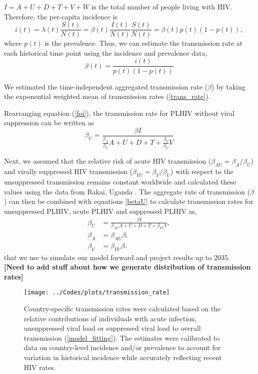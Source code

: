 \documentclass[11pt]{article}
\newcommand{\comment}[1]{\textbf{[#1]}}
\begin{document}
$I = A+U+D+T+V+W$ is the total number of people living with HIV. Therefore, the per-capita
incidence is
\begin{equation}
i(t) = \lambda(t) \frac{S(t)}{N(t)}
= \beta(t) \frac{I(t)}{N(t)} \frac{S(t)}{N(t)} =\beta(t) p(t) (1-p(t)),
\end{equation}
where $p(t)$ is the prevalence. Thus, we can estimate the
transmission rate at each historical time point using the incidence
and prevalence data,
\begin{equation}
  \label{trans_rate}
  \beta(t) = \frac{i(t)}{p(t)(1-p(t))}
\end{equation}


We estimated the time-independent aggregated transmission rate ($\beta$)
by taking the exponential weighted mean of transmission rates
(\ref{trans_rate}).


Rearranging equation (\ref{foi}), the transmission rate for PLHIV
without viral suppression can be written as
\begin{equation}
\label{betaU}
  \beta_{U} = \frac{\beta I}{\frac{\beta_{A}}{\beta_{U}}A +
    U+D+T+\frac{\beta_{V}}{\beta_{U}}V}
\end{equation}


Next, we assumed that the relative risk of acute HIV transmission
($\beta_{AU} = \beta_{A}/\beta_{U}$) and virally suppressed HIV
transmission ($\beta_{VU} = \beta_{V}/\beta_{U}$) with respect to the
unsuppressed transmission remains constant worldwide and calculated
these values using the data from Rakai, Uganda \cite{Wawer2005-us}. The aggregate
rate of transmission ($\beta$) can then be combined with equations \ref{betaU} to calculate transmission
rates for unsuppressed PLHIV, acute PLHIV and suppressed PLHIV as,
\begin{align}
  \beta_{U} & = \frac{\beta I}{\beta_{AU}A +
              U+D+T+\beta_{VU}V}, \\
  \beta_{A} & = \beta_{AU}\beta, \\
  \beta_{V} & = \beta_{VU} \beta.
\end{align}
that we use to simulate our model forward and project results up to 2035.
\\

\comment{Need to add stuff about how we generate distribution of
  transmission rates}




\begin{figure}
  \centering
  \texttt{[image: ../Codes/plots/transmission\_rate]}
  \caption{Country-specific transmission rates were calculated based
    on the relative contributions of individuals with acute infection,
    unsuppressed viral load or suppressed viral load to overall
    transmission (\autoref{model_fitting}). The estimates were
    calibrated to data on country-level incidence and/or prevalence to
    account for variation in historical incidence while accurately
    reflecting recent HIV rates.}
  \label{transmission_rate}
\end{figure}
\end{document}

